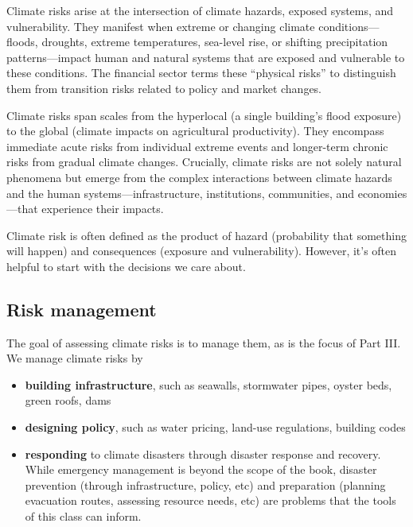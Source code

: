 \documentclass[
  letterpaper,
  DIV=11,
  numbers=noendperiod]{scrreprt}
\providecommand{\tightlist}{%
  \setlength{\itemsep}{0pt}\setlength{\parskip}{0pt}}
\begin{document}

Climate risks arise at the intersection of climate hazards, exposed
systems, and vulnerability. They manifest when extreme or changing
climate conditions---floods, droughts, extreme temperatures, sea-level
rise, or shifting precipitation patterns---impact human and natural
systems that are exposed and vulnerable to these conditions. The
financial sector terms these ``physical risks'' to distinguish them from
transition risks related to policy and market changes.

Climate risks span scales from the hyperlocal (a single building's flood
exposure) to the global (climate impacts on agricultural productivity).
They encompass immediate acute risks from individual extreme events and
longer-term chronic risks from gradual climate changes. Crucially,
climate risks are not solely natural phenomena but emerge from the
complex interactions between climate hazards and the human
systems---infrastructure, institutions, communities, and
economies---that experience their impacts.

Climate risk is often defined as the product of hazard (probability that
something will happen) and consequences (exposure and vulnerability).
However, it's often helpful to start with the decisions we care about.

\subsection*{Risk management}\label{risk-management}

The goal of assessing climate risks is to manage them, as is the focus
of Part III. We manage climate risks by

\begin{itemize}
\tightlist
\item
  \textbf{building infrastructure}, such as seawalls, stormwater pipes,
  oyster beds, green roofs, dams
\item
  \textbf{designing policy}, such as water pricing, land-use
  regulations, building codes
\item
  \textbf{responding} to climate disasters through disaster response and
  recovery. While emergency management is beyond the scope of the book,
  disaster prevention (through infrastructure, policy, etc) and
  preparation (planning evacuation routes, assessing resource needs,
  etc) are problems that the tools of this class can inform.
\end{itemize}
\end{document}
